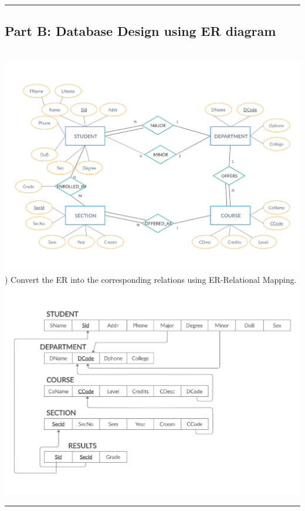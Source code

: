 \documentclass[12pt,letterpaper]{article}
\begin{document}
\hrule
\bigskip
\newpage
\begin{landscape}
\subsection*{Part B: Database Design using ER diagram}
\bigskip
{}\\
\bigskip
\includegraphics[trim=0mm 20mm 0mm 0mm, clip, width=17.35cm]{ER-converted.pdf}
\bigskip
{}) Convert the ER into the corresponding relations using ER-Relational Mapping.\\
\bigskip
\includegraphics[trim=0mm 20mm 0mm 0mm, clip, width=17.35cm]{Relation-converted.pdf}
\bigskip
\hrule
\end{landscape}
\end{document}
